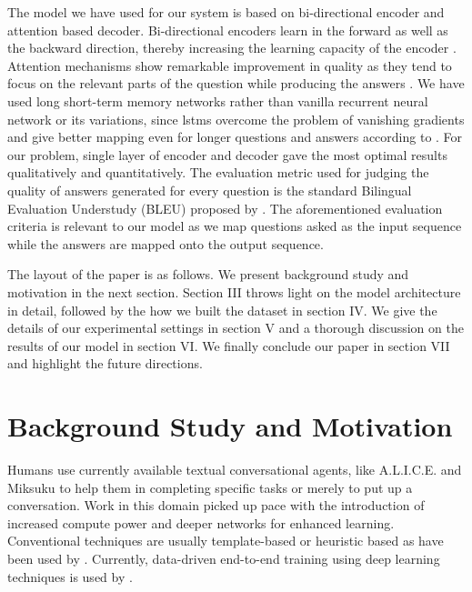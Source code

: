 \documentclass[conference]{IEEEtran}
\begin{document}
The model we have used for our system is based on bi-directional encoder and attention based decoder. Bi-directional encoders learn in the forward as well as the backward direction, thereby increasing the learning capacity of the encoder \cite{BahdanauCB14}. Attention mechanisms show remarkable improvement in quality as they tend to focus on the relevant parts of the question while producing the answers \cite{BahdanauCB14}. We have used long short-term memory networks rather than vanilla recurrent neural network or its variations, since lstms overcome the problem of vanishing gradients and give better mapping even for longer questions and answers according to \cite{hochreiter1997long}. For our problem, single layer of encoder and decoder gave the most optimal results qualitatively and quantitatively. The evaluation metric used for judging the quality of answers generated for every question is the standard Bilingual Evaluation Understudy (BLEU) proposed by \cite{papineni2002bleu}. The aforementioned evaluation criteria is relevant to our model as we map questions asked as the input sequence while the answers are mapped onto the output sequence.   
   
The layout of the paper is as follows. We present background study and motivation in the next section. Section III throws light on the model architecture in detail, followed by the how we built the dataset in section IV. We give the details of our experimental settings in section V and a thorough discussion on the results of our model in section VI. We finally conclude our paper in section VII and highlight the future directions. 	

\section{Background Study and Motivation}

Humans use currently available textual conversational agents, like A.L.I.C.E. and Miksuku to help them in completing specific tasks or merely to put up a conversation. Work in this domain picked up pace with the introduction of increased compute power and deeper networks for enhanced learning. Conventional techniques are usually template-based or heuristic based as have been used by \cite{Nio2014,Ameixa2014}. Currently, data-driven end-to-end training using deep learning techniques is used by 
\cite{Serban2016building, Shang2015, Sordoni2015, Gao2018neural}. 
\end{document}
